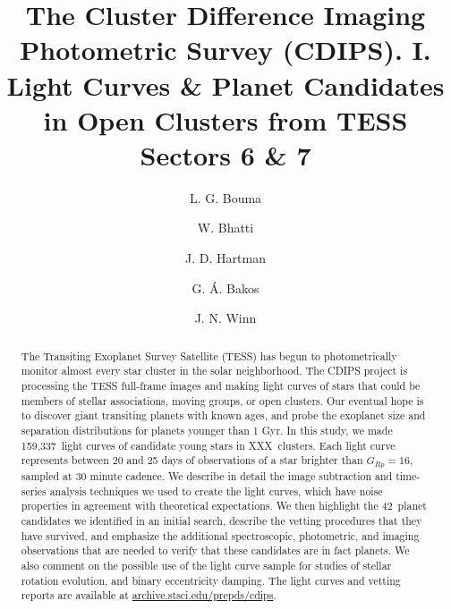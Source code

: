 \documentclass[12pt,twocolumn,tighten]{aastex62}
\newcommand{\numberpcs}{42\ }
\newcommand{\numberlcs}{159{,}337\ } %
\newcommand{\numberclusters}{XXX\ }
\begin{document}
\title{
  The Cluster Difference Imaging Photometric Survey (CDIPS).  I.
  Light Curves \& Planet Candidates in Open Clusters from TESS Sectors 6 \& 7
}


\author[0000-0002-0514-5538]{L. G. Bouma}
%
\author[0000-0002-0628-0088]{W. Bhatti}
%
\author[0000-0001-8732-6166]{J. D. Hartman}
%
\author[0000-0001-7204-6727]{G. \'A. Bakos}
%
\author[0000-0002-4265-047X]{J. N. Winn}

\begin{abstract}
  The Transiting Exoplanet Survey Satellite (TESS) has begun to
  photometrically monitor almost every star cluster in
  the solar neighborhood.
  The CDIPS project is processing the TESS
  full-frame images and making light curves of stars that could be
  members of stellar associations, moving groups, or open clusters.
  Our eventual hope is to discover giant transiting planets with known
  ages, and probe the exoplanet size and separation distributions for
  planets younger than 1 Gyr.
  In this study, we made \numberlcs light curves of candidate young
  stars in \numberclusters clusters.
  Each light curve represents between 20 and 25 days of observations
  of a star brighter than $G_{Rp}=16$, sampled at 30 minute cadence.
  We describe in detail the image subtraction and time-series analysis 
  techniques we used to create the light curves, which
  have noise properties in agreement with theoretical expectations.
  We then highlight the \numberpcs planet candidates we identified in
  an initial search, describe the vetting procedures that they have
  survived, and emphasize the additional spectroscopic, photometric,
  and imaging observations that are needed to verify that these
  candidates are in fact planets.
  We also comment on the possible use of the light curve sample for
  studies of stellar rotation evolution, and binary eccentricity
  damping.
  The light curves and vetting reports are available at
  \url{archive.stsci.edu/prepds/cdips}.
\end{abstract}
\end{document}
